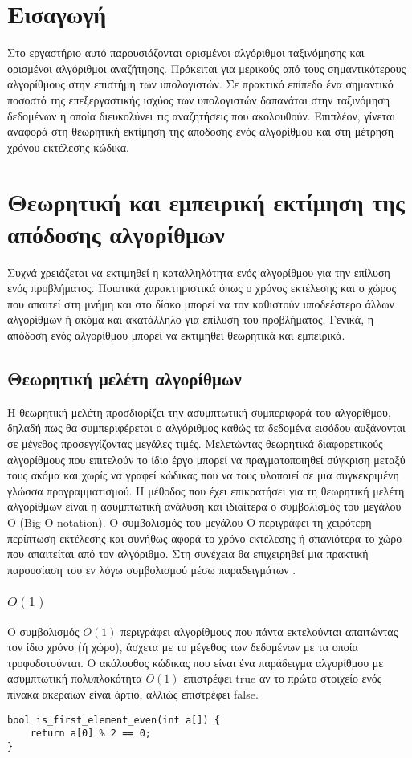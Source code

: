 \section{Εισαγωγή}
Στο εργαστήριο αυτό παρουσιάζονται ορισμένοι αλγόριθμοι ταξινόμησης και ορισμένοι αλγόριθμοι αναζήτησης. Πρόκειται για μερικούς από τους σημαντικότερους αλγορίθμους στην επιστήμη των υπολογιστών. Σε πρακτικό επίπεδο ένα σημαντικό ποσοστό της επεξεργαστικής ισχύος των υπολογιστών δαπανάται στην ταξινόμηση δεδομένων η οποία διευκολύνει τις αναζητήσεις που ακολουθούν. Επιπλέον, γίνεται αναφορά στη θεωρητική εκτίμηση της απόδοσης ενός αλγορίθμου και στη μέτρηση χρόνου εκτέλεσης κώδικα.

\section{Θεωρητική και εμπειρική εκτίμηση της απόδοσης αλγορίθμων}
Συχνά χρειάζεται να εκτιμηθεί η καταλληλότητα ενός αλγορίθμου για την επίλυση ενός προβλήματος. Ποιοτικά χαρακτηριστικά όπως ο χρόνος εκτέλεσης και ο χώρος που απαιτεί στη μνήμη και στο δίσκο μπορεί να τον καθιστούν υποδεέστερο άλλων αλγορίθμων ή ακόμα και ακατάλληλο για επίλυση του προβλήματος. Γενικά, η απόδοση ενός αλγορίθμου μπορεί να εκτιμηθεί θεωρητικά και εμπειρικά. 
\subsection{Θεωρητική μελέτη αλγορίθμων}
Η θεωρητική μελέτη προσδιορίζει την ασυμπτωτική συμπεριφορά του αλγορίθμου, δηλαδή πως θα συμπεριφέρεται ο αλγόριθμος καθώς τα δεδομένα εισόδου αυξάνονται σε μέγεθος προσεγγίζοντας μεγάλες τιμές. Μελετώντας θεωρητικά διαφορετικούς αλγορίθμους που επιτελούν το ίδιο έργο μπορεί να πραγματοποιηθεί σύγκριση μεταξύ τους ακόμα και χωρίς να γραφεί κώδικας που να τους υλοποιεί σε μια συγκεκριμένη γλώσσα προγραμματισμού. Η μέθοδος που έχει επικρατήσει για τη θεωρητική μελέτη αλγορίθμων είναι η ασυμπτωτική ανάλυση και ιδιαίτερα ο συμβολισμός του μεγάλου Ο (Big O notation). Ο συμβολισμός του μεγάλου Ο περιγράφει τη χειρότερη περίπτωση εκτέλεσης και συνήθως αφορά το χρόνο εκτέλεσης ή σπανιότερα το χώρο που απαιτείται από τον αλγόριθμο. Στη συνέχεια θα επιχειρηθεί μια πρακτική παρουσίαση του εν λόγω συμβολισμού μέσω παραδειγμάτων \cite{robbell}.
\subsubsection{$O(1)$}
Ο συμβολισμός $O(1)$ περιγράφει αλγορίθμους που πάντα εκτελούνται απαιτώντας τον ίδιο χρόνο (ή χώρο), άσχετα με το μέγεθος των δεδομένων με τα οποία τροφοδοτούνται. Ο ακόλουθος κώδικας που είναι ένα παράδειγμα αλγορίθμου με ασυμπτωτική πολυπλοκότητα $O(1)$ επιστρέφει true αν το πρώτο στοιχείο ενός πίνακα ακεραίων είναι άρτιο, αλλιώς επιστρέφει false.
\begin{lstlisting}
bool is_first_element_even(int a[]) { 
	return a[0] % 2 == 0; 
}
\end{lstlisting}

